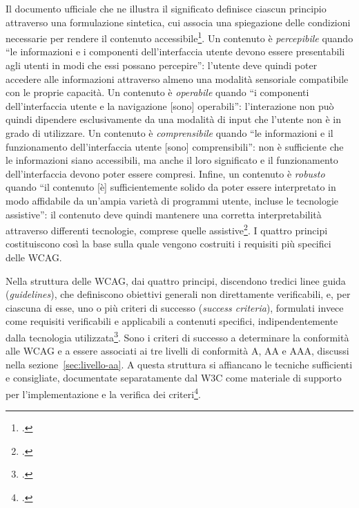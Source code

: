 Il documento ufficiale che ne illustra il significato definisce ciascun principio attraverso una formulazione sintetica, cui associa una spiegazione delle condizioni necessarie per rendere il contenuto accessibile\footcite[§ \enquote{Understanding the Four Principles of Accessibility}]{w3c:understanding-intro}. Un contenuto è \emph{percepibile} quando \enquote{le informazioni e i componenti dell'interfaccia utente devono essere presentabili agli utenti in modi che essi possano percepire}: l'utente deve quindi poter accedere alle informazioni attraverso almeno una modalità sensoriale compatibile con le proprie capacità. Un contenuto è \emph{operabile} quando \enquote{i componenti dell'interfaccia utente e la navigazione [sono] operabili}: l'interazione non può quindi dipendere esclusivamente da una modalità di input che l'utente non è in grado di utilizzare. Un contenuto è \emph{comprensibile} quando \enquote{le informazioni e il funzionamento dell'interfaccia utente [sono] comprensibili}: non è sufficiente che le informazioni siano accessibili, ma anche il loro significato e il funzionamento dell'interfaccia devono poter essere compresi. Infine, un contenuto è \emph{robusto} quando \enquote{il contenuto [è] sufficientemente solido da poter essere interpretato in modo affidabile da un'ampia varietà di programmi utente, incluse le tecnologie assistive}: il contenuto deve quindi mantenere una corretta interpretabilità attraverso differenti tecnologie, comprese quelle assistive\footcite{w3c:understanding-intro}. I quattro principi costituiscono così la base sulla quale vengono costruiti i requisiti più specifici delle WCAG.

Nella struttura delle WCAG, dai quattro principi, discendono tredici linee guida (\emph{guidelines}), che definiscono obiettivi generali non direttamente verificabili, e, per ciascuna di esse, uno o più criteri di successo (\emph{success criteria}), formulati invece come requisiti verificabili e applicabili a contenuti specifici, indipendentemente dalla tecnologia utilizzata\footcite[§~0.2 \enquote{WCAG 2 Livelli di orientamento}]{w3c:wcag21}. Sono i criteri di successo a determinare la conformità alle WCAG e a essere associati ai tre livelli di conformità A, AA e AAA, discussi nella sezione~\ref{sec:livello-aa}. A questa struttura si affiancano le tecniche sufficienti e consigliate, documentate separatamente dal W3C come materiale di supporto per l'implementazione e la verifica dei criteri\footcite{w3c:quickref}.

